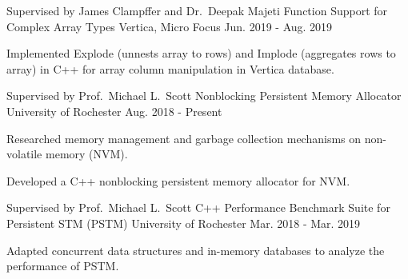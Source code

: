 

\begin{cventries}

  \cventry
    {Supervised by James Clampffer and Dr.\ Deepak Majeti} %
    {Function Support for Complex Array Types} %
    {Vertica, Micro Focus} %
    {Jun. 2019 - Aug. 2019} %
    {
      \begin{cvitems} %
        \item {Implemented Explode (unnests array to rows) and Implode (aggregates rows to array) in C++ for array column manipulation in Vertica database.}
      \end{cvitems}
    }

  \cventry
    {Supervised by Prof.\ Michael L.\ Scott} %
    {Nonblocking Persistent Memory Allocator} %
    {University of Rochester} %
    {Aug. 2018 - Present} %
    {
      \begin{cvitems} %
        \item {Researched memory management and garbage collection mechanisms on non-volatile memory (NVM).}
        \item {Developed a C++ nonblocking persistent memory allocator for NVM.}
      \end{cvitems}
	  }

  \cventry
    {Supervised by Prof.\ Michael L.\ Scott} %
    {C++ Performance Benchmark Suite for Persistent STM (PSTM)} %
    {University of Rochester} %
    {Mar. 2018 - Mar. 2019} %
    {
      \begin{cvitems} %
        \item {Adapted concurrent data structures and in-memory databases to analyze the performance of PSTM.}
      \end{cvitems}
    }


\end{cventries}
